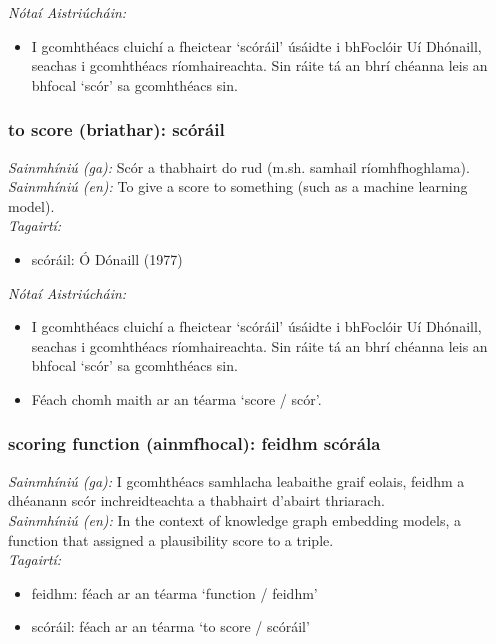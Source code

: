  \noindent \textit{Nótaí Aistriúcháin:}
\begin{itemize}
	\item I gcomhthéacs cluichí a fheictear `scóráil' úsáidte i bhFoclóir Uí Dhónaill, seachas i gcomhthéacs ríomhaireachta. Sin ráite tá an bhrí chéanna leis an bhfocal `scór' sa gcomhthéacs sin.
\end{itemize}


\subsubsection*{to score (briathar): scóráil}
 \noindent \textit{Sainmhíniú (ga):} Scór a thabhairt do rud (m.sh. samhail ríomhfhoghlama).
\\
 \noindent \textit{Sainmhíniú (en):} To give a score to something (such as a machine learning model).
\\
 \noindent \textit{Tagairtí:}
\begin{itemize}
	\item scóráil: Ó Dónaill (1977) \cite{odonaill}
\end{itemize}

 \noindent \textit{Nótaí Aistriúcháin:}
\begin{itemize}
	\item I gcomhthéacs cluichí a fheictear `scóráil' úsáidte i bhFoclóir Uí Dhónaill, seachas i gcomhthéacs ríomhaireachta. Sin ráite tá an bhrí chéanna leis an bhfocal `scór' sa gcomhthéacs sin.
	\item Féach chomh maith ar an téarma `score / scór'.
\end{itemize}


\subsubsection*{scoring function (ainmfhocal): feidhm scórála}
 \noindent \textit{Sainmhíniú (ga):} I gcomhthéacs samhlacha leabaithe graif eolais, feidhm a dhéanann scór inchreidteachta a thabhairt d'abairt thriarach.
\\
 \noindent \textit{Sainmhíniú (en):} In the context of knowledge graph embedding models, a function that assigned a plausibility score to a triple.
\\
 \noindent \textit{Tagairtí:}
\begin{itemize}
	\item feidhm: féach ar an téarma `function / feidhm'
	\item scóráil: féach ar an téarma `to score / scóráil'
\end{itemize}

